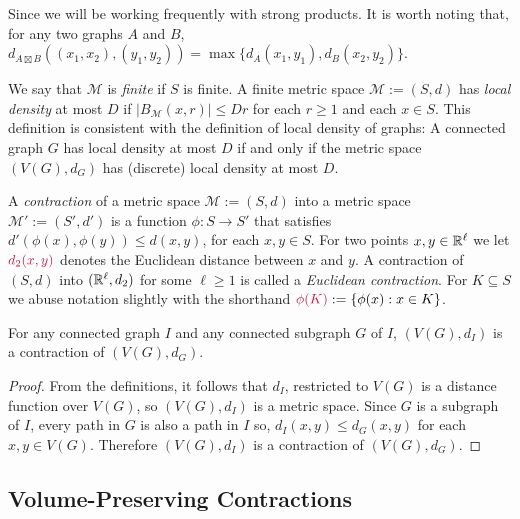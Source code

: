 \documentclass{patmorin}
\makeatletter
\newcommand{\defin}[1]{\emph{\textcolor{brightmaroon}{#1}}}
\def\mathcolor#1#{\@mathcolor{#1}}
\def\@mathcolor#1#2#3{%
  \protect\leavevmode
  \begingroup
    \color#1{#2}#3%
  \endgroup
}
\newcommand{\mathdefin}[1]{\mathcolor{brightmaroon}{#1}}
\makeatother
\begin{document}

Since we will be working frequently with strong products. It is worth noting that, for any two graphs $A$ and $B$, $d_{A\boxtimes B}((x_1,x_2),(y_1,y_2))=\max\{d_A(x_1,y_1),d_B(x_2,y_2)\}$.

We say that $\mathcal{M}$ is \defin{finite} if $S$ is finite.  A finite metric space $\mathcal{M}:=(S,d)$ has \defin{local density} at most $D$ if $|B_\mathcal{M}(x,r)|\le Dr$ for each $r\ge 1$ and each $x\in S$.
This definition is consistent with the definition of local density of graphs:  A connected graph $G$ has local density at most $D$ if and only if the metric space $(V(G),d_G)$ has (discrete) local density at most $D$.

A \defin{contraction} of a metric space $\mathcal{M}:=(S,d)$ into a metric space $\mathcal{M'}:=(S',d')$ is a function $\phi:S\to S'$ that satisfies $d'(\phi(x),\phi(y))\le d(x,y)$, for each $x,y\in S$.  For two points $x,y\in\mathbb{R}^\ell$ we let $\mathdefin{d_2(x,y)}$ denotes the Euclidean distance between $x$ and $y$.  A contraction of $(S,d)$ into $(\mathbb{R}^\ell, d_2)$ for some $\ell\ge 1$ is called a \defin{Euclidean contraction}.  For $K\subseteq S$ we abuse notation slightly with the shorthand $\mathdefin{\phi(K)}:=\{\phi(x):x\in K\}$.

\begin{obs}\label{supergraph_contraction}
  For any connected graph $I$ and any connected subgraph $G$ of $I$, $(V(G),d_I)$ is a contraction of $(V(G),d_G)$.
\end{obs}

\begin{proof}
  From the definitions, it follows that $d_I$, restricted to $V(G)$ is a distance function over $V(G)$, so $(V(G),d_I)$ is a metric space.  Since $G$ is a subgraph of $I$, every path in $G$ is also a path in $I$ so, $d_I(x,y)\le d_G(x,y)$ for each $x,y\in V(G)$.  Therefore $(V(G),d_I)$ is a contraction of $(V(G),d_G)$.
\end{proof}


\subsection{Volume-Preserving Contractions}
\end{document}
